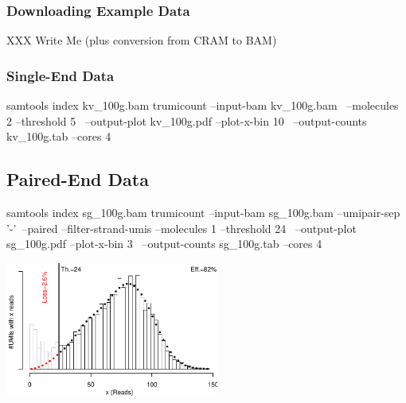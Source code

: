 \documentclass[10pt]{article}
\begin{document}
\subsubsection*{Downloading Example Data}

XXX Write Me (plus conversion from CRAM to BAM)

\subsubsection*{Single-End Data}

\begin{shellcode}
samtools index kv_100g.bam
trumicount --input-bam kv_100g.bam \
  --molecules 2 --threshold 5 \
  --output-plot kv_100g.pdf --plot-x-bin 10 \
  --output-counts kv_100g.tab
  --cores 4
\end{shellcode}

\subsection{Paired-End Data}

\begin{shellcode}
samtools index sg_100g.bam
trumicount --input-bam sg_100g.bam --umipair-sep '-'\
  --paired --filter-strand-umis --molecules 1 --threshold 24 \
  --output-plot sg_100g.pdf --plot-x-bin 3 \
  --output-counts sg_100g.tab
  --cores 4
\end{shellcode}

{\centering \includegraphics[width=7cm]{examples/sg_100g.pdf}\\}
\end{document}

